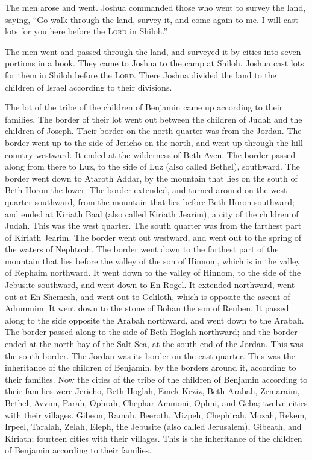  The men arose and went. Joshua commanded those who went
to survey the land, saying, ``Go walk through the land, survey it, and
come again to me. I will cast lots for you here before the \textsc{Lord}
in Shiloh.''

 The men went and passed through the land, and surveyed it
by cities into seven portions in a book. They came to Joshua to the camp
at Shiloh.  Joshua cast lots for them in Shiloh before
the \textsc{Lord}. There Joshua divided the land to the children of
Israel according to their divisions.

 The lot of the tribe of the children of Benjamin came up
according to their families. The border of their lot went out between
the children of Judah and the children of Joseph.  Their
border on the north quarter was from the Jordan. The border went up to
the side of Jericho on the north, and went up through the hill country
westward. It ended at the wilderness of Beth Aven.  The
border passed along from there to Luz, to the side of Luz (also called
Bethel), southward. The border went down to Ataroth Addar, by the
mountain that lies on the south of Beth Horon the lower. 
The border extended, and turned around on the west quarter southward,
from the mountain that lies before Beth Horon southward; and ended at
Kiriath Baal (also called Kiriath Jearim), a city of the children of
Judah. This was the west quarter.  The south quarter was
from the farthest part of Kiriath Jearim. The border went out westward,
and went out to the spring of the waters of Nephtoah. 
The border went down to the farthest part of the mountain that lies
before the valley of the son of Hinnom, which is in the valley of
Rephaim northward. It went down to the valley of Hinnom, to the side of
the Jebusite southward, and went down to En Rogel.  It
extended northward, went out at En Shemesh, and went out to Geliloth,
which is opposite the ascent of Adummim. It went down to the stone of
Bohan the son of Reuben.  It passed along to the side
opposite the Arabah northward, and went down to the Arabah.
 The border passed along to the side of Beth Hoglah
northward; and the border ended at the north bay of the Salt Sea, at the
south end of the Jordan. This was the south border.  The
Jordan was its border on the east quarter. This was the inheritance of
the children of Benjamin, by the borders around it, according to their
families.  Now the cities of the tribe of the children of
Benjamin according to their families were Jericho, Beth Hoglah, Emek
Keziz,  Beth Arabah, Zemaraim, Bethel, 
Avvim, Parah, Ophrah,  Chephar Ammoni, Ophni, and Geba;
twelve cities with their villages.  Gibeon, Ramah,
Beeroth,  Mizpeh, Chephirah, Mozah, 
Rekem, Irpeel, Taralah,  Zelah, Eleph, the Jebusite (also
called Jerusalem), Gibeath, and Kiriath; fourteen cities with their
villages. This is the inheritance of the children of Benjamin according
to their families.

